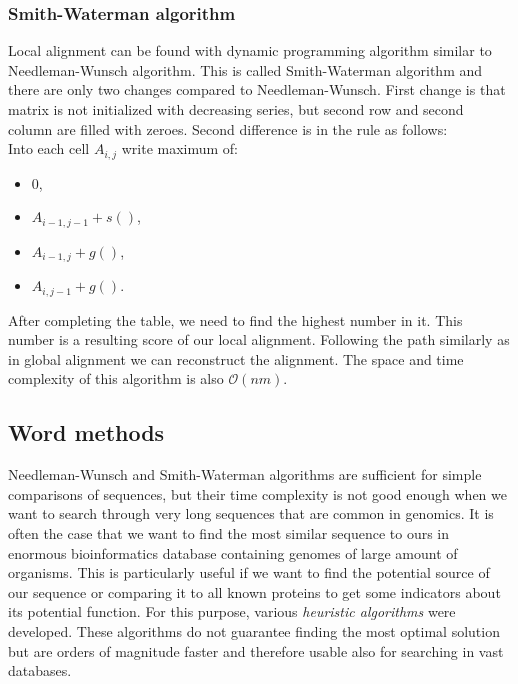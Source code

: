 \subsubsection{Smith-Waterman algorithm}
Local alignment can be found with dynamic programming algorithm similar to Needleman-Wunsch algorithm.
This is called Smith-Waterman algorithm and there are only two changes compared to Needleman-Wunsch.
First change is that matrix is not initialized with decreasing series, but second row and second column are filled with zeroes.
Second difference is in the rule as follows:\\
Into each cell $A_{i,j}$ write maximum of:
\begin{itemize}
\item $0$,
\item $A_{i-1, j-1} + s()$,
\item $A_{i-1, j} + g()$,
\item $A_{i, j-1} + g()$.
\end{itemize}
After completing the table, we need to find the highest number in it.
This number is a resulting score of our local alignment.
Following the path similarly as in global alignment we can reconstruct the alignment.
The space and time complexity of this algorithm is also $\mathcal{O}(nm)$.

\subsection{Word methods}
Needleman-Wunsch and Smith-Waterman algorithms are sufficient for simple comparisons of sequences, but their time complexity is not good enough when we want to search through very long sequences that are common in genomics.
It is often the case that we want to find the most similar sequence to ours in enormous bioinformatics database containing genomes of large amount of organisms.
This is particularly useful if we want to find the potential source of our sequence or comparing it to all known proteins to get some indicators about its potential function.
For this purpose, various \emph{heuristic algorithms} were developed.
These algorithms do not guarantee finding the most optimal solution but are orders of magnitude faster and therefore usable also for searching in vast databases.

